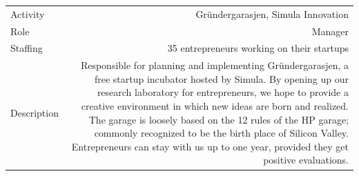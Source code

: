 \documentclass[english,a4paper,11pt]{article}
\begin{document}
\begin{tabular}{@{}LR}
Activity & Gründergarasjen, Simula Innovation\\
Role & Manager\\
Staffing & 35 entrepreneurs working on their startups\\
Description & Responsible for planning and implementing Gründergarasjen, a free startup incubator hosted by Simula. By opening up our research laboratory for entrepreneurs, we hope to provide a creative environment in which new ideas are born and realized. The garage is loosely based on the 12 rules of the HP garage; commonly recognized to be the birth place of Silicon Valley. Entrepreneurs can stay with us up to one year, provided they get positive evaluations.\\ 
\end{tabular}
\end{document}
